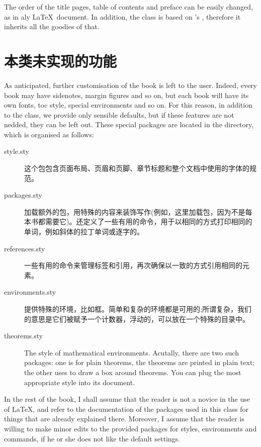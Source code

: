 The order of the title pages, table of contents and preface can be 
easily changed, as in aly \LaTeX\ document. In addition, the class is 
based on \KOMAScript's , therefore it inherits all the 
goodies of that.

\section{本类未实现的功能}

As anticipated, further customisation of the book is left to the user. 
Indeed, every book may have sidenotes, margin figures and so on, but 
each book will have its own fonts, toc style, special environments and 
so on. For this reason, in addition to the class, we provide only 
sensible defaults, but if these features are not nedded, they can be 
left out. These special packages are located in the  
directory, which is organised as follows:

\begin{description}
	\item[style.sty] 这个包包含页面布局、页眉和页脚、章节标题和整个文档中使用的字体的规范。
	\item[packages.sty] 加载额外的包，用特殊的内容来装饰写作(例如，这里加载包，因为不是每本书都需要它)。还定义了一些有用的命令，用于以相同的方式打印相同的单词，例如斜体的拉丁单词或逐字的。
	\item[references.sty] 一些有用的命令来管理标签和引用，再次确保以一致的方式引用相同的元素。
	\item[environments.sty] 提供特殊的环境，比如框。简单和复杂的环境都是可用的;所谓复杂，我们的意思是它们被赋予一个计数器，浮动的，可以放在一个特殊的目录中。
	\item[theorems.sty] The style of mathematical environments. 
	Acutally, there are two such packages: one is for plain theorems, 
	\ie the theorems are printed in plain text; the other uses 
	 to draw a box around theorems. You can plug the 
	most appropriate style into its document.
\end{description}


In the rest of the book, I shall assume that the reader is not a novice 
in the use of \LaTeX, and refer to the documentation of the packages 
used in this class for things that are already explained there. 
Moreover, I assume that the reader is willing to make minor edits to the 
provided packages for styles, environments and commands, if he or she 
does not like the default settings.
